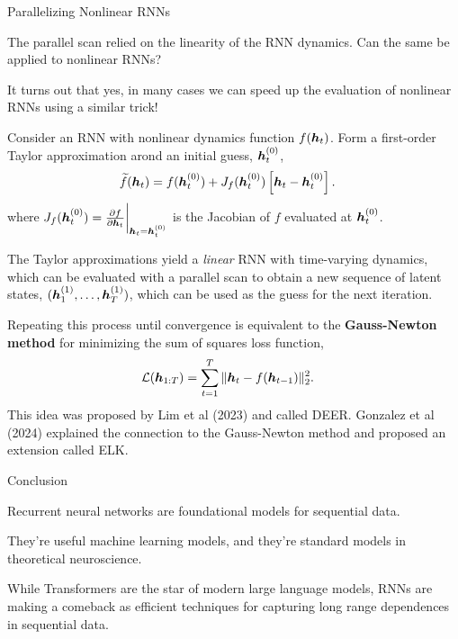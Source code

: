 \documentclass[aspectratio=169]{beamer}
\begin{document}
\begin{frame}[t,allowframebreaks]{Parallelizing Nonlinear
RNNs}\label{parallelizing-nonlinear-rnns}

The parallel scan relied on the linearity of the RNN dynamics. Can the
same be applied to nonlinear RNNs?

It turns out that yes, in many cases we can speed up the evaluation of
nonlinear RNNs using a similar trick!

Consider an RNN with nonlinear dynamics function \(f(\boldsymbol{h}_t)\). Form a
first-order Taylor approximation arond an initial guess,
\(\boldsymbol{h}_t^{(0)}\), \begin{align*}
\widetilde{f}(\boldsymbol{h}_t) &= f(\boldsymbol{h}_t^{(0)}) + J_f(\boldsymbol{h}_t^{(0)}) \left[ \boldsymbol{h}_t - \boldsymbol{h}_t^{(0)} \right]. 
\end{align*} where
\(J_f(\boldsymbol{h}_t^{(0)}) = \frac{\partial f}{\partial \boldsymbol{h}_t}\bigg|_{\boldsymbol{h}_t = \boldsymbol{h}_t^{(0)}}\)
is the Jacobian of \(f\) evaluated at \(\boldsymbol{h}_t^{(0)}\).

The Taylor approximations yield a \emph{linear} RNN with time-varying
dynamics, which can be evaluated with a parallel scan to obtain a new
sequence of latent states, \((\boldsymbol{h}_1^{(1)}, \ldots, \boldsymbol{h}_T^{(1)})\),
which can be used as the guess for the next iteration.

Repeating this process until convergence is equivalent to the
\textbf{Gauss-Newton method} for minimizing the sum of squares loss
function, 
\begin{align*}
\mathcal{L}(\boldsymbol{h}_{1:T}) &= \sum_{t=1}^T \|\boldsymbol{h}_t - f(\boldsymbol{h}_{t-1})\|_2^2.
\end{align*} 
This idea was proposed by Lim et al (2023) and called DEER.
Gonzalez et al (2024) explained the connection to the Gauss-Newton
method and proposed an extension called ELK.
\end{frame}

\begin{frame}[t,allowframebreaks]{Conclusion}\label{conclusion}

Recurrent neural networks are foundational models for sequential data.

They're useful machine learning models, and they're standard models in
theoretical neuroscience. 

While Transformers are the star of modern
large language models, RNNs are making a comeback as efficient
techniques for capturing long range dependences in sequential data.
\end{frame}
    
    
\end{document}
